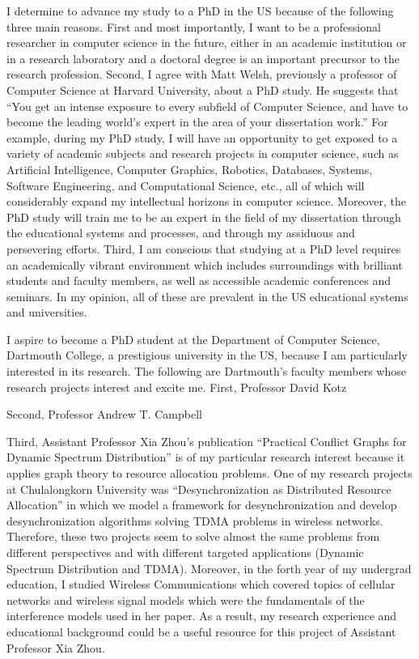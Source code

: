 \documentclass[a4paper,10pt]{report}
\newcommand{\university}{Dartmouth College}
\newcommand{\department}{Department of Computer Science}
\newcommand{\uniabbre}{Dartmouth}
\begin{document}
\vspace{0.2cm}
I determine to advance my study to a PhD in the US because of the following three main reasons. First and most importantly, I want to be a professional researcher in computer science in the future, either in an academic institution or in a research laboratory and a doctoral degree is an important precursor to the research profession. Second, I agree with Matt Welsh, previously a professor of Computer Science at Harvard University, about a PhD study. He suggests that ``You get an intense exposure to every subfield of Computer Science, and have to become the leading world's expert in the area of your dissertation work.'' For example, during my PhD study, I will have an opportunity to get exposed to a variety of academic subjects and research projects in computer science, such as Artificial Intelligence, Computer Graphics, Robotics, Databases, Systems, Software Engineering, and Computational Science, etc., all of which will considerably expand my intellectual horizons in computer science. Moreover, the PhD study will train me to be an expert in the field of my dissertation through the educational systems and processes, and through my assiduous and persevering efforts. Third, I am conscious that studying at a PhD level requires an academically vibrant environment which includes surroundings with brilliant students and faculty members, as well as accessible academic conferences and seminars. In my opinion, all of these are prevalent in the US educational systems and universities.

\vspace{0.2cm}
I aspire to become a PhD student at the \department, \university, a prestigious university in the US, because I am particularly interested in its research. The following are \uniabbre's faculty members whose research projects interest and excite me. First, Professor David Kotz 

\vspace{0.2cm}
Second, Professor Andrew T. Campbell

\vspace{0.2cm}
Third, Assistant Professor Xia Zhou's publication ``Practical Conflict Graphs for Dynamic Spectrum Distribution'' is of my particular research interest because it applies graph theory to resource allocation problems. One of my research projects at Chulalongkorn University was ``Desynchronization as Distributed Resource Allocation'' in which we model a framework for desynchronization and develop desynchronization algorithms solving TDMA problems in wireless networks. Therefore, these two projects seem to solve almost the same problems from different perspectives and with different targeted applications (Dynamic Spectrum Distribution and TDMA). Moreover, in the forth year of my undergrad education, I studied Wireless Communications which covered topics of cellular networks and wireless signal models which were the fundamentals of the interference models used in her paper. As a result, my research experience and educational background could be a useful resource for this project of Assistant Professor Xia Zhou. 
\end{document}
